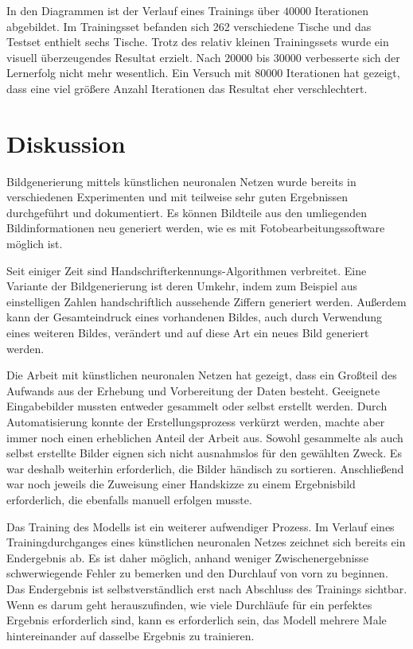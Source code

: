 \clearpage

In den Diagrammen ist der Verlauf eines Trainings über $40000$ Iterationen abgebildet. Im Trainingsset befanden sich 262 verschiedene Tische und das Testset enthielt sechs Tische. Trotz des relativ kleinen Trainingssets wurde ein visuell überzeugendes Resultat erzielt. Nach $20000$ bis $30000$ verbesserte sich der Lernerfolg nicht mehr wesentlich. Ein Versuch mit $80000$ Iterationen hat gezeigt, dass eine viel größere Anzahl Iterationen das Resultat eher verschlechtert.

\chapter{Diskussion}
\label{sec:conclusion}
Bildgenerierung mittels künstlichen neuronalen Netzen wurde bereits in verschiedenen Experimenten und mit teilweise sehr guten Ergebnissen durchgeführt und dokumentiert. Es können Bildteile aus den umliegenden Bildinformationen neu generiert werden, wie es mit Fotobearbeitungssoftware möglich ist.

Seit einiger Zeit sind Handschrifterkennungs-Algorithmen verbreitet. Eine Variante der Bildgenerierung ist deren Umkehr, indem zum Beispiel aus einstelligen Zahlen handschriftlich aussehende Ziffern generiert werden. Außerdem kann der Gesamteindruck eines vorhandenen Bildes, auch durch Verwendung eines weiteren Bildes, verändert und auf diese Art ein neues Bild generiert werden.

Die Arbeit mit künstlichen neuronalen Netzen hat gezeigt, dass ein Großteil des Aufwands aus der Erhebung und Vorbereitung der Daten besteht. Geeignete Eingabebilder mussten entweder gesammelt oder selbst erstellt werden. Durch Automatisierung konnte der Erstellungsprozess verkürzt werden, machte aber immer noch einen erheblichen Anteil der Arbeit aus. Sowohl gesammelte als auch selbst erstellte Bilder eignen sich nicht ausnahmslos für den gewählten Zweck. Es war deshalb weiterhin erforderlich, die Bilder händisch zu sortieren. Anschließend war noch jeweils die Zuweisung einer Handskizze zu einem Ergebnisbild erforderlich, die ebenfalls manuell erfolgen musste.

Das Training des Modells ist ein weiterer aufwendiger Prozess. Im
Verlauf eines Trainingdurchganges eines künstlichen neuronalen Netzes zeichnet sich bereits ein Endergebnis ab. Es ist daher möglich, anhand weniger Zwischenergebnisse schwerwiegende Fehler zu bemerken und den Durchlauf von vorn zu beginnen. Das Endergebnis ist selbstverständlich erst nach Abschluss des Trainings sichtbar. Wenn es darum geht herauszufinden, wie viele Durchläufe für ein perfektes Ergebnis erforderlich sind, kann es erforderlich sein, das Modell mehrere Male hintereinander auf dasselbe Ergebnis zu trainieren.

